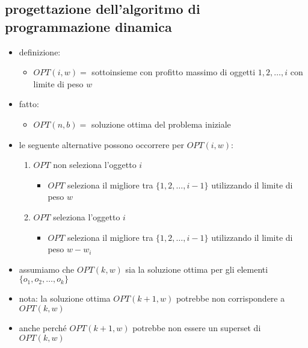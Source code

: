 
\subsection*{progettazione dell'algoritmo di programmazione dinamica}
\begin{flushleft}
	\begin{itemize}
		\item definizione:
		\begin{itemize}
			\item $OPT(i,w)=$ sottoinsieme con profitto massimo di oggetti $1,2,\ldots,i$ con limite di peso $w$
		\end{itemize}
		\item fatto:
		\begin{itemize}
			\item $OPT(n,b)=$ soluzione ottima del problema iniziale
		\end{itemize}
		\item le seguente alternative possono occorrere per $OPT(i,w)$:
		\begin{enumerate}
			\item $OPT$ non seleziona l'oggetto $i$
			\begin{itemize}
				\item $OPT$ seleziona il migliore tra $\{1,2,\ldots,i-1\}$ utilizzando il limite di peso $w$
			\end{itemize}
			\item $OPT$ seleziona l'oggetto $i$
			\begin{itemize}
				\item $OPT$ seleziona il migliore tra $\{1,2,\ldots,i-1\}$ utilizzando il limite di peso $w-w_i$
			\end{itemize}
		\end{enumerate}
		\item assumiamo che $OPT(k,w)$ sia la soluzione ottima per gli elementi $\{o_1,o_2,\ldots,o_k\}$
		\item nota: la soluzione ottima $OPT(k+1,w)$ potrebbe non corrispondere a $OPT(k,w)$
		\item anche perch\'e $OPT(k+1,w)$ potrebbe non essere un superset di $OPT(k,w)$
	\end{itemize}
\end{flushleft}


